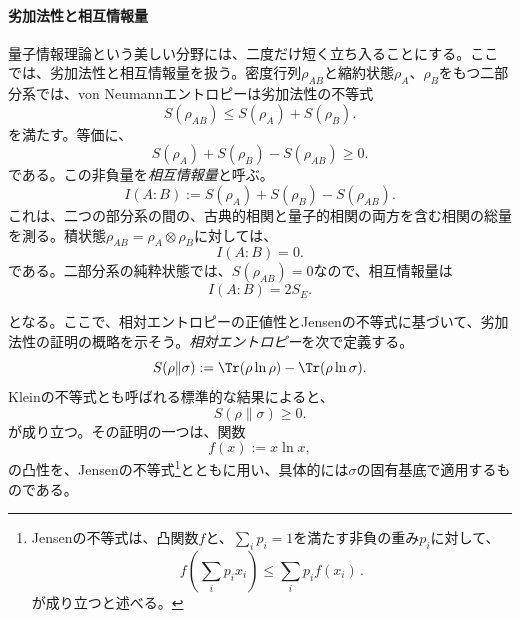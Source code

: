\documentclass[a4paper,11pt,oneside]{article}
\theoremstyle{definition}
\numberwithin{equation}{section}
\begin{document}
\paragraph{劣加法性と相互情報量} 量子情報理論という美しい分野には、二度だけ短く立ち入ることにする。ここでは、劣加法性と相互情報量を扱う。密度行列$\rho_{AB}$と縮約状態$\rho_A$、$\rho_B$をもつ二部分系では、von Neumannエントロピーは劣加法性の不等式
\begin{equation}\label{subadditivity}
S(\rho_{AB}) \le S(\rho_A)+S(\rho_B) .
\end{equation}
を満たす。等価に、
\begin{equation}
S(\rho_A)+S(\rho_B)-S(\rho_{AB}) \ge 0 .
\end{equation}
である。この非負量を\textit{相互情報量}と呼ぶ。
\begin{equation}
I(A:B)
:=
S(\rho_A)+S(\rho_B)-S(\rho_{AB}) .
\end{equation}
これは、二つの部分系の間の、古典的相関と量子的相関の両方を含む相関の総量を測る。積状態$\rho_{AB}=\rho_A\otimes\rho_B$に対しては、
\begin{equation}
I(A:B)=0 .
\end{equation}
である。二部分系の純粋状態では、$S(\rho_{AB})=0$なので、相互情報量は
\begin{equation}
I(A:B)=2S_E .
\end{equation}


となる。ここで、相対エントロピーの正値性とJensenの不等式に基づいて、劣加法性の証明の概略を示そう。\textit{相対エントロピー}を次で定義する。
\begin{equation}
S(\rho\|\sigma)
:=
\Tr(\rho \ln \rho)-\Tr(\rho \ln \sigma) .
\end{equation}
Kleinの不等式とも呼ばれる標準的な結果によると、
\begin{equation}
S(\rho\|\sigma)\ge 0 .
\end{equation}
が成り立つ。その証明の一つは、関数
\begin{equation}
f(x):=x\ln x ,
\end{equation}
の凸性を、Jensenの不等式\footnote{Jensenの不等式は、凸関数$f$と、$\sum_i p_i=1$を満たす非負の重み$p_i$に対して、
\begin{equation}
f\!\left(\sum_i p_i x_i\right) \le \sum_i p_i f(x_i) \,.
\end{equation}
が成り立つと述べる。}とともに用い、具体的には$\sigma$の固有基底で適用するものである。
\end{document}

